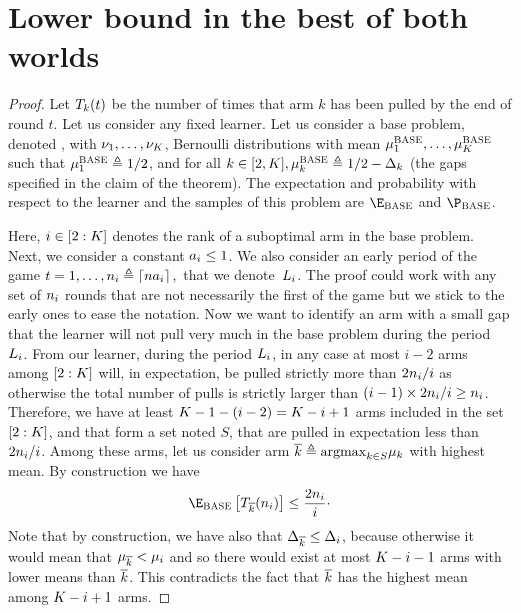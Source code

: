 %

\section{Lower bound in the best of both worlds} %
\label{app:prooflowBOB}
%
\setcounter{scratchcounter}{\value{theorem}}
\thi*
\setcounter{theorem}{\the\numexpr\value{scratchcounter}}
\begin{proof}%
	Let $T_{k}(t)$ be the number of times that arm 
	$k$ has been pulled by the end of round $t$.
	Let us consider any fixed learner.
	Let us consider a base problem, denoted \basePro{}, with $\nu_1,\ldots, \nu_K$, 
	Bernoulli distributions with mean $\mu^{\textsc{BASE}}_1,
	\ldots, \mu^{\textsc{BASE}}_K$ 
	such that $\mu^{\textsc{BASE}}_1 \triangleq 1/2$, and for all $k\in[2,K], 
	\mu^{\textsc{BASE}}_k \triangleq  1/2-\Delta_k$ 
	(the gaps specified in the claim of the theorem).
	The expectation and probability with respect to the
	learner and the samples of this problem are 
	$\Exp_{\basePro}$ and $\Pro_{\basePro}$.%
	
	Here, $i\in[2:K]$ denotes the rank of a suboptimal arm in the
	base problem. Next, we consider  a constant $a_i\leq 1$.
	We also consider  an early  period of the game $t=1,\ldots,
	n_i\triangleq\lceil na_i\rceil$,\
	that we denote~$L_i$. %
	The proof could work with any set of $n_i$ rounds 
	that are not necessarily the first of the game but we stick 
	to the early ones to ease the notation.
	Now we want to identify an arm with a small gap that the 
	learner will not pull
	very much in the base problem \basePro{}
	during the period~$L_i$.
	From our learner, during the period $L_i$, 
	in any case at most 
	$i-2$ arms among $[2:K]$ %
	will, in expectation, be pulled strictly more than 
	$2n_i/i $ as otherwise the total number of pulls
	is strictly larger than $(i-1)\times2n_i/i\geq n_i$.
	Therefore, we have at least $K-1-(i-2)=K-i+1$ arms 
	included in the set $[2:K]$, 
	and that form a set
	noted $S$,  that are pulled in expectation less than $2n_i/i $.
	Among these arms, let us consider  arm $\overline k \triangleq \mathrm{argmax}_{k\in S}
	\mu_k$ with highest mean. By construction we have
	\begin{equation}\label{eq:notSoMuchPulls}
	\Exp_{\basePro}\left[\pullsNumber_{\refarm}(n_i) \right]\leq \frac{2n_i}{i}\cdot
	\end{equation}
	Note that by construction, we have also that  $\Delta_{\overline k}\leq\Delta_i$, because
	otherwise it would mean that $\mu_{\overline k}<\mu_i$ 
	and so there would exist at most $K-i-1$ arms with lower means than $\overline k$.
	This contradicts the fact that $\overline k$ has the highest 
	mean among $K-i+1$ arms.
	

\end{proof}
